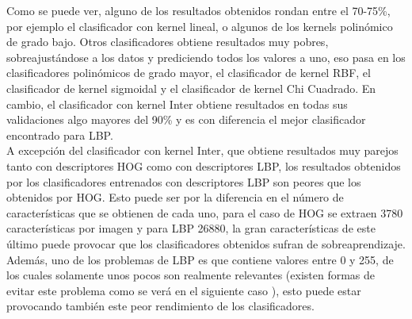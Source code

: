 Como se puede ver, alguno de los resultados obtenidos rondan entre el 70-75\%, por ejemplo el clasificador con kernel lineal, o algunos de los kernels polinómico de grado bajo. Otros clasificadores obtiene resultados muy pobres, sobreajustándose a los datos y prediciendo todos los valores a uno, eso pasa en los clasificadores polinómicos de grado mayor, el clasificador de kernel RBF, el clasificador de kernel sigmoidal y el clasificador de kernel Chi Cuadrado. En cambio, el clasificador con kernel Inter obtiene resultados en todas sus validaciones algo mayores del 90\% y es con diferencia el mejor clasificador encontrado para LBP. \\

A excepción del clasificador con kernel Inter, que obtiene resultados muy parejos tanto con descriptores HOG como con descriptores LBP, los resultados obtenidos por los clasificadores entrenados con descriptores LBP son peores que los obtenidos por HOG. Esto puede ser por la diferencia en el número de características que se obtienen de cada uno, para el caso de HOG se extraen 3780 características por imagen y para LBP 26880, la gran características de este último puede provocar que los clasificadores obtenidos sufran de sobreaprendizaje. Además, uno de los problemas de LBP es que contiene valores entre 0 y 255, de los cuales solamente unos pocos son realmente relevantes (existen formas de evitar este problema como se verá en el siguiente caso ), esto puede estar provocando también este peor rendimiento de los clasificadores.
